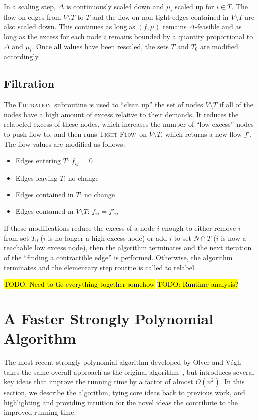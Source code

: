\documentclass[11pt]{article}
\theoremstyle{definition}
\theoremstyle{definition}
\newcommand{\tf}{\textsc{Tight-Flow}}
\newcommand{\filtration}{\textsc{Filtration}}
\newcommand{\todo}[1]{\hl{TODO: #1}}
\begin{document}
	In a scaling step, $\Delta$ is continuously scaled down
    and $\mu_i$ scaled up for $i \in T$. The flow on edges from $V \setminus T$ to $T$ and the flow
    on non-tight edges contained in $V \setminus T$ are also scaled down. This continues as long
    as $(f, \mu)$ remains $\Delta$-feasible and as long as the excess for each node $i$
    remains bounded by a quantity proportional to $\Delta$ and $\mu_i$.
    Once all values have been rescaled, the sets $T$ and $T_0$ are modified accordingly.  
	
	\subsection{Filtration}\label{sec:filtration}
    
	The \filtration\ subroutine is used to ``clean up'' the set of nodes $V \setminus T$ if
    all of the nodes have a high amount of excess relative to their demands. 
    It reduces the relabeled excess of these nodes,
    which increases the number of
    ``low excess'' nodes to push flow to,
    and then runs \tf\ on $V\setminus T$,
    which returns a new flow $f'$. The flow values are modified as follows: 
	\begin{itemize}[itemsep=-1mm]
	\item Edges entering $T$: $f_{ij}$ = 0
	\item Edges leaving $T$: no change
	\item Edges contained in $T$: no change
	\item Edges contained in $V\setminus T$: $f_{ij} = f'_{ij}$
	\end{itemize}
	
	If these modifications reduce the excess of a node $i$ enough to either remove $i$ from set $T_0$
    ($i$ is no longer a high excess node) or add $i$ to set $N \cap T$ ($i$ is now a reachable
    low excess node), then the algorithm terminates and the next iteration of the
    ``finding a contractible edge'' is performed. Otherwise, the algorithm terminates
    and the elementary step routine is called to relabel.

		\todo{Need to tie everything together somehow}
		\todo{Runtime analysis?}

\section{A Faster Strongly Polynomial Algorithm}\label{sec:2017}

The most recent strongly polynomial algorithm developed by Olver and Végh \cite{Olver2017} takes the same overall approach as the original algorithm~\cite{Vegh2013}, but introduces several key ideas that improve the running time by a factor of almost $O(n^2)$. 
In this section, we describe the algorithm, tying core ideas back to previous work, and highlighting and providing intuition for the novel ideas the contribute to the improved running time. 
\end{document}
